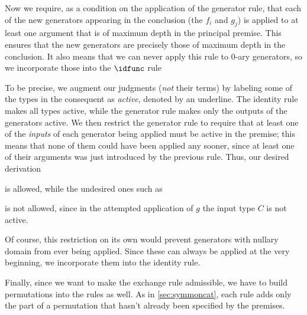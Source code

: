 Now we require, as a condition on the application of the generator rule, that each of the new generators appearing in the conclusion (the $f_i$ and $g_j$) is applied to at least one argument that is of maximum depth in the principal premise.
This ensures that the new generators are precisely those of maximum depth in the conclusion.
It also means that we can never apply this rule to 0-ary generators, so we incorporate those into the $\idfunc$ rule







To be precise, we augment our judgments (\emph{not} their terms) by labeling some of the types in the consequent as \emph{active}, denoted by an underline.
The identity rule makes all types active, while the generator rule makes only the outputs of the generators active.
We then restrict the generator rule to require that at least one of the \emph{inputs} of each generator being applied must be active in the premise; this means that none of them could have been applied any sooner, since at least one of their arguments was just introduced by the previous rule.
Thus, our desired derivation
\begin{mathpar}
\end{mathpar}
is allowed, while the undesired ones such as
\begin{mathpar}
\end{mathpar}
is not allowed, since in the attempted application of $g$ the input type $C$ is not active.

Of course, this restriction on its own would prevent generators with nullary domain from ever being applied.
Since these can always be applied at the very beginning, we incorporate them into the identity rule.

Finally, since we want to make the exchange rule admissible, we have to build permutations into the rules as well.
As in \cref{sec:symmoncat}, each rule adds only the part of a permutation that hasn't already been specified by the premises.

